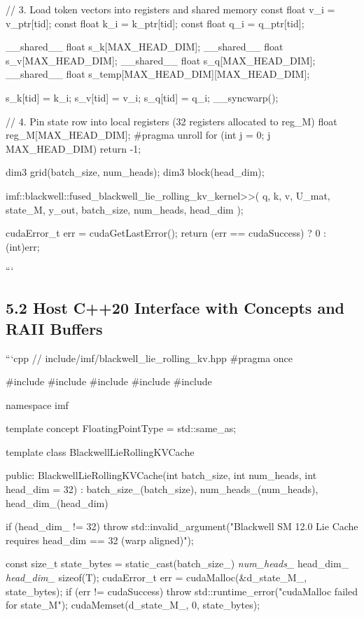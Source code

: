 \documentclass[11pt,twoside,openright]{amsbook}
\begin{document}
{{{{{{{{{    // 3. Load token vectors into registers and shared memory
    const float v_i = v_ptr[tid];
    const float k_i = k_ptr[tid];
    const float q_i = q_ptr[tid];

    __shared__ float s_k[MAX_HEAD_DIM];
    __shared__ float s_v[MAX_HEAD_DIM];
    __shared__ float s_q[MAX_HEAD_DIM];
    __shared__ float s_temp[MAX_HEAD_DIM][MAX_HEAD_DIM];

    s_k[tid] = k_i;
    s_v[tid] = v_i;
    s_q[tid] = q_i;
    __syncwarp();

    // 4. Pin state row into local registers (32 registers allocated to reg_M)
    float reg_M[MAX_HEAD_DIM];
    #pragma unroll
    for (int j = 0; j  MAX_HEAD_DIM) {
        return -1;
    }

    dim3 grid(batch_size, num_heads);
    dim3 block(head_dim);

    imf::blackwell::fused_blackwell_lie_rolling_kv_kernel>>(
        q, k, v, U_mat, state_M, y_out, batch_size, num_heads, head_dim
    );

    cudaError_t err = cudaGetLastError();
    return (err == cudaSuccess) ? 0 : (int)err;
}

}
```

\subsection{5.2 Host C++20 Interface with Concepts and RAII Buffers}

```cpp
// include/imf/blackwell_lie_rolling_kv.hpp
#pragma once

#include 
#include 
#include 
#include 
#include 

namespace imf {

template 
concept FloatingPointType = std::same_as;

template 
class BlackwellLieRollingKVCache {
public:
    BlackwellLieRollingKVCache(int batch_size, int num_heads, int head_dim = 32)
        : batch_size_(batch_size), num_heads_(num_heads), head_dim_(head_dim) {
        if (head_dim_ != 32) {
            throw std::invalid_argument("Blackwell SM 12.0 Lie Cache requires head_dim == 32 (warp aligned)");
        }

        const size_t state_bytes = static_cast(batch_size_) \textit{ num_heads_ } head_dim_ \textit{ head_dim_ } sizeof(T);
        cudaError_t err = cudaMalloc(&d_state_M_, state_bytes);
        if (err != cudaSuccess) throw std::runtime_error("cudaMalloc failed for state_M");
        cudaMemset(d_state_M_, 0, state_bytes);
    }

}}}}}}}}}
\end{document}
